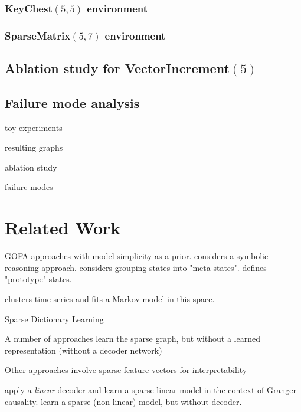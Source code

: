 \documentclass[a4paper,11pt,oneside]{report}
\begin{document}
\subsection{KeyChest$(5, 5)$ environment}
\subsection{SparseMatrix$(5, 7)$ environment}

\section{Ablation study for VectorIncrement$(5)$}

\section{Failure mode analysis}

toy experiments

resulting graphs

ablation study

failure modes



\chapter{Related Work}
\label{ch:related_work}

GOFA approaches with model simplicity as a prior. \cite{Ave, DesJardins1993} considers a symbolic reasoning approach. \cite{Jonsson2006} considers grouping states into "meta states". \cite{Corneil2018} defines "prototype" states.

\cite{Fortuin2018} clusters time series and fits a Markov model in this space.

Sparse Dictionary Learning \cite{Vincent2002, Kreutz-delgado2003, Mairal2009, Baze2012}

A number of approaches learn the sparse graph, but without a learned representation (without a decoder network) \cite{Fu2013,Chalupka2017}

Other approaches involve sparse feature vectors for interpretability \cite{Weinstein,Zhu2017,VandenOord2017,Cha2018,Deng}

\cite{Barnett2015} apply a {\em linear} decoder and learn a sparse linear model in the context of Granger causality. \cite{Kalainathan2018} learn a sparse (non-linear) model, but without  decoder.
\end{document}
